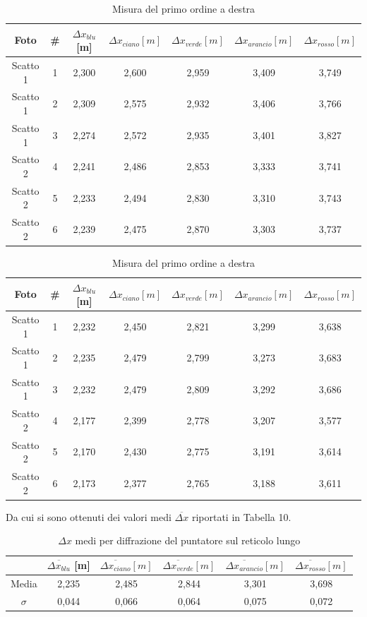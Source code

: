 \documentclass{article}
\begin{document}
\begin{table}[h]
    \centering
    \begin{tabular}{||c|c|c|c|c|c|c||}
        \hline
        Foto & \# & \cellcolor{blue}$\Delta x_{blu}$ [m] & \cellcolor{cyan}$\Delta x_{ciano}[m]$ & \cellcolor{green}$\Delta x_{verde}[m]$ & \cellcolor{orange}$\Delta x_{arancio}[m]$ & \cellcolor{red}$\Delta x_{rosso}[m]$ \\
        \hline
        Scatto 1 & 1 & 2,300 & 2,600 & 2,959 & 3,409 & 3,749 \\
        Scatto 1 & 2 & 2,309 & 2,575 & 2,932 & 3,406 & 3,766 \\
        Scatto 1 & 3 & 2,274 & 2,572 & 2,935 & 3,401 & 3,827 \\
        Scatto 2 & 4 & 2,241 & 2,486 & 2,853 & 3,333 & 3,741 \\
        Scatto 2 & 5 & 2,233 & 2,494 & 2,830 & 3,310 & 3,743 \\
        Scatto 2 & 6 & 2,239 & 2,475 & 2,870 & 3,303 & 3,737 \\
        \hline
    \end{tabular}
    \caption{Misura del primo ordine a sinistra}
\centering
\begin{tabular}{||c|c|c|c|c|c|c||}
    \hline
    Foto & \# & \cellcolor{blue}$\Delta x_{blu}$ [m] & \cellcolor{cyan}$\Delta x_{ciano}[m]$ & \cellcolor{green}$\Delta x_{verde}[m]$ & \cellcolor{orange}$\Delta x_{arancio}[m]$ & \cellcolor{red}$\Delta x_{rosso}[m]$ \\
    \hline
    Scatto 1 & 1 & 2,232 & 2,450 & 2,821 & 3,299 & 3,638 \\
    Scatto 1 & 2 & 2,235 & 2,479 & 2,799 & 3,273 & 3,683 \\
    Scatto 1 & 3 & 2,232 & 2,479 & 2,809 & 3,292 & 3,686 \\
    Scatto 2 & 4 & 2,177 & 2,399 & 2,778 & 3,207 & 3,577 \\
    Scatto 2 & 5 & 2,170 & 2,430 & 2,775 & 3,191 & 3,614 \\
    Scatto 2 & 6 & 2,173 & 2,377 & 2,765 & 3,188 & 3,611 \\
    \hline
\end{tabular}
\caption{Misura del primo ordine a destra}
\end{table}

\clearpage
Da cui si sono ottenuti dei valori medi $\overline{\Delta x}$ riportati in Tabella 10.

\begin{table}[h]
    \centering
\begin{tabular}{||c|c|c|c|c|c||}
    \hline
     & \cellcolor{blue}$\overline{\Delta x_{blu}}$ [m] & \cellcolor{cyan}$\overline{\Delta x_{ciano}} [m]$ & \cellcolor{green}$\overline{\Delta x_{verde}}[m]$ & \cellcolor{orange}$\overline{\Delta x_{arancio}}[m]$ & \cellcolor{red}$\overline{\Delta x_{rosso}}[m]$ \\
    \hline
    Media & 2,235 & 2,485 & 2,844 & 3,301 & 3,698 \\
    $\sigma$ & 0,044 & 0,066 & 0,064 & 0,075 & 0,072\\
    \hline
\end{tabular}
\caption{$\Delta x$ medi per diffrazione del puntatore sul reticolo lungo}
\end{table}
\end{document}
